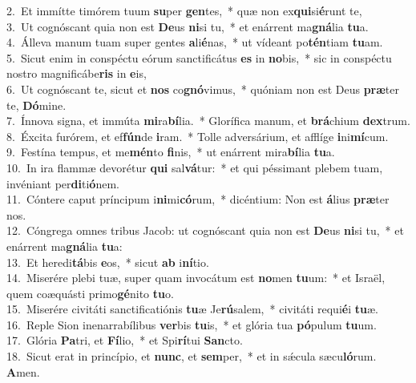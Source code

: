 {2.~}Et immítte timórem tuum \textbf{su}per \textbf{gen}tes,~* quæ non ex\textbf{qui}si\textbf{é}runt te,\\
{3.~}Ut cognóscant quia non est \textbf{De}us \textbf{ni}si tu,~* et enárrent ma\textbf{gná}lia \textbf{tu}a.\\
{4.~}Álleva manum tuam super gentes \textbf{a}li\textbf{é}nas,~* ut vídeant po\textbf{tén}tiam \textbf{tu}am.\\
{5.~}Sicut enim in conspéctu eórum sanctificátus \textbf{es} in \textbf{no}bis,~* sic in conspéctu nostro magnificábe\textbf{ris} in \textbf{e}is,\\
{6.~}Ut cognóscant te, sicut et \textbf{nos} co\textbf{gnó}vimus,~* quóniam non est Deus \textbf{præ}ter te, \textbf{Dó}mine.\\
{7.~}Ínnova signa, et immúta \textbf{mi}ra\textbf{bí}lia.~* Glorífica manum, et \textbf{brá}chium \textbf{dex}trum.\\
{8.~}Éxcita furórem, et ef\textbf{fún}de \textbf{i}ram.~* Tolle adversárium, et afflíge \textbf{i}ni\textbf{mí}cum.\\
{9.~}Festína tempus, et me\textbf{mén}to \textbf{fi}nis,~* ut enárrent mira\textbf{bí}lia \textbf{tu}a.\\
{10.~}In ira flammæ devorétur \textbf{qui} sal\textbf{vá}tur:~* et qui péssimant plebem tuam, invéniant per\textbf{di}ti\textbf{ó}nem.\\
{11.~}Cóntere caput príncipum i\textbf{ni}mi\textbf{có}rum,~* dicéntium: Non est \textbf{á}lius \textbf{præ}ter nos.\\
{12.~}Cóngrega omnes tribus Jacob: ut cognóscant quia non est \textbf{De}us \textbf{ni}si tu,~* et enárrent ma\textbf{gná}lia \textbf{tu}a:\\
{13.~}Et heredi\textbf{tá}bis \textbf{e}os,~* sicut \textbf{ab} i\textbf{ní}tio.\\
{14.~}Miserére plebi tuæ, super quam invocátum est \textbf{no}men \textbf{tu}um:~* et Israël, quem coæquásti primo\textbf{gé}nito \textbf{tu}o.\\
{15.~}Miserére civitáti sanctificatiónis \textbf{tu}æ Je\textbf{rú}salem,~* civitáti requi\textbf{é}i \textbf{tu}æ.\\
{16.~}Reple Sion inenarrabílibus \textbf{ver}bis \textbf{tu}is,~* et glória tua \textbf{pó}pulum \textbf{tu}um.\\
{17.~}Glória \textbf{Pa}tri, et \textbf{Fí}lio,~* et Spi\textbf{rí}tui \textbf{San}cto.\\
{18.~}Sicut erat in princípio, et \textbf{nunc}, et \textbf{sem}per,~* et in sǽcula sæcu\textbf{ló}rum. \textbf{A}men.\\
